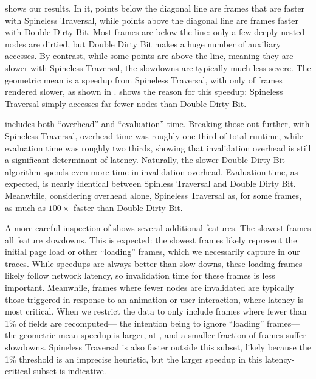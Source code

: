   shows our results.
In it, points below the diagonal line
  are frames that are faster with Spineless Traversal,
  while points above the diagonal line
  are frames faster with Double Dirty Bit.
Most frames are below the line:
  only a few deeply-nested nodes are dirtied,
  but Double Dirty Bit makes a huge number of auxiliary accesses.
By contrast, while some points are above the line,
  meaning they are slower with Spineless Traversal,
  the slowdowns are typically much less severe.
The geometric mean is a \MeanSpeedup speedup
  from Spineless Traversal,
  with only \PctSlower of frames rendered slower,
  as shown in .
 shows the reason for this speedup:
  Spineless Traversal simply accesses far fewer nodes
  than Double Dirty Bit.

 includes both
  ``overhead'' and ``evaluation'' time.
Breaking those out further, with Spineless Traversal,
  overhead time was roughly one third of total runtime,
  while evaluation time was roughly two thirds,
  showing that invalidation overhead is still
  a significant determinant of latency.
Naturally, the slower Double Dirty Bit algorithm
  spends even more time in invalidation overhead.
Evaluation time, as expected, is nearly identical
  between Spinless Traversal and Double Dirty Bit.
Meanwhile, considering overhead alone,
  Spineless Traversal as, for some frames,
  as much as $100\times$ faster than Double Dirty Bit.

A more careful inspection of  shows
  several additional features.
The slowest frames all feature slowdowns.
This is expected: the slowest frames likely represent
  the initial page load or other ``loading'' frames,
  which we necessarily capture in our traces.
While speedups are always better than slow-downs,
  these loading frames likely follow network latency,
  so invalidation time for these frames is less important.
Meanwhile, frames where fewer nodes are invalidated
  are typically those triggered in response to
  an animation or user interaction,
  where latency is most critical.
When we restrict the data to only include frames
  where fewer than 1\% of fields are recomputed---%
  the intention being to ignore ``loading'' frames---%
  the geometric mean speedup is larger,
  at \MeanSpeedupSmall,
  and a smaller fraction of frames suffer slowdowns.
Spineless Traversal is also faster outside this subset,
  likely because the 1\% threshold is an imprecise heuristic,
  but the larger speedup 
  in this latency-critical subset is indicative.

